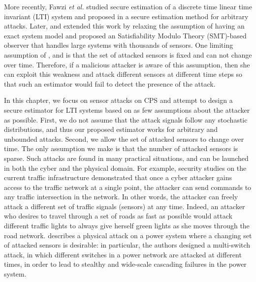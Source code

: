 \documentclass[../../thesis.tex]{subfiles}
\begin{document}
More recently, Fawzi \textit{et al.} studied secure estimation of a discrete time linear time invariant (LTI) system and proposed in \cite{Fawzi:2014} a secure estimation method for arbitrary attacks. 
Later, \cite{Pajic:2014} and \cite{shoukry2016smt} extended this work by relaxing the assumption of having an exact system model and proposed an Satisfiability Modulo Theory (SMT)-based observer that handles large systems with thousands of sensors. 
One limiting assumption of \cite{Fawzi:2014}, \cite{Pajic:2014} and \cite{shoukry2016smt} is that the set of attacked sensors is fixed and can not change over time. 
Therefore, if a malicious attacker is aware of this assumption, then she can exploit this weakness and attack different sensors at different time steps so that such an estimator would fail to detect the presence of the attack.

In this chapter, we focus on sensor attacks on CPS and attempt to design a secure estimator for LTI systems based on as few assumptions about the attacker as possible. 
First, we do not assume that the attack signals follow any stochastic distributions, and thus our proposed estimator works for arbitrary and unbounded attacks.
Second, we allow the set of attacked sensors to change over time.
The only assumption we make is that the number of attacked sensors is sparse.
Such attacks are found in many practical situations, and can be launched in both the cyber and the physical domain.
For example, security studies on the current traffic infrastructure \cite{ghena2014traffic} demonstrated that once a cyber attacker gains access to the traffic network at a single point, the attacker can send commands to any traffic intersection in the network. 
In other words, the attacker can freely attack a different set of traffic signals (sensors) at any time. Indeed, an attacker who desires to travel through a set of roads as fast as possible would attack different traffic lights to always give herself green lights as she moves through the road network. 
\cite{liu2014coordinated} describes a physical attack on a power system where a changing set of attacked sensors is desirable: in particular, the authors designed a multi-switch attack, in which different switches in a power network are attacked at different times, in order to lead to stealthy and wide-scale cascading failures in the power system.
\end{document}
